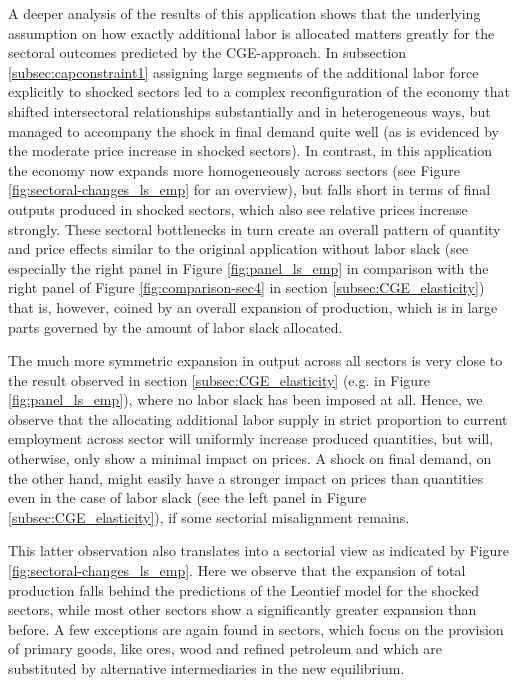 \documentclass{article}
\begin{document}
A deeper analysis of the results of this application shows that the underlying assumption on how exactly additional labor is allocated matters greatly for the sectoral outcomes predicted by the CGE-approach. In subsection \ref{subsec:capconstraint1} assigning large segments of the additional labor force explicitly to shocked sectors led to a complex reconfiguration of the economy that shifted intersectoral relationships substantially and in heterogeneous ways, but managed to accompany the shock in final demand quite well (as is evidenced by the moderate price increase in shocked sectors). In contrast, in this application the economy now expands more homogeneously across sectors (see Figure \ref{fig:sectoral-changes_ls_emp} for an overview), but falls short in terms of final outputs produced in shocked sectors, which also see relative prices increase strongly. These sectoral bottlenecks in turn create an overall pattern of quantity and price effects similar to the original application without labor slack (see especially the right panel in Figure \ref{fig:panel_ls_emp} in comparison with the right panel of Figure \ref{fig:comparison-sec4} in section \ref{subsec:CGE_elasticity}) that is, however, coined by an overall expansion of production, which is in large parts governed by the amount of labor slack allocated. 

The much more symmetric expansion in output across all sectors is very close to the result observed in section \ref{subsec:CGE_elasticity} (e.g. in Figure \ref{fig:panel_ls_emp}), where no labor slack has been imposed at all. Hence, we observe that the allocating additional labor supply in strict proportion to current employment across sector will uniformly increase produced quantities, but will, otherwise, only show a minimal impact on prices. A shock on final demand, on the other hand, might easily have a stronger impact on prices than quantities even in the case of labor slack (see the left panel in Figure \ref{subsec:CGE_elasticity}), if some sectorial misalignment remains.

This latter observation also translates into a sectorial view as indicated by Figure \ref{fig:sectoral-changes_ls_emp}. Here we observe that the expansion of total production falls behind the predictions of the Leontief model for the shocked sectors, while most other sectors show a significantly greater expansion than before. A few exceptions are again found in sectors, which focus on the provision of primary goods, like ores, wood and refined petroleum and which are substituted by alternative intermediaries in the new equilibrium.
\end{document}

